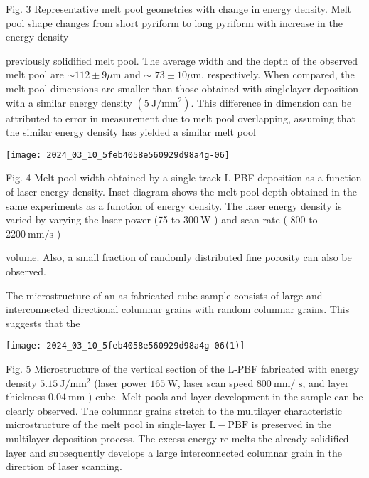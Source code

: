 \documentclass[10pt]{article}
\begin{document}
Fig. 3 Representative melt pool geometries with change in energy density. Melt pool shape changes from short pyriform to long pyriform with increase in the energy density

previously solidified melt pool. The average width and the depth of the observed melt pool are $\sim 112 \pm 9 \mu \mathrm{m}$ and $\sim$ $73 \pm 10 \mu \mathrm{m}$, respectively. When compared, the melt pool dimensions are smaller than those obtained with singlelayer deposition with a similar energy density $\left(5 \mathrm{~J} / \mathrm{mm}^{2}\right)$. This difference in dimension can be attributed to error in measurement due to melt pool overlapping, assuming that the similar energy density has yielded a similar melt pool

\begin{center}
\texttt{[image: 2024\_03\_10\_5feb4058e560929d98a4g-06]}
\end{center}

Fig. 4 Melt pool width obtained by a single-track L-PBF deposition as a function of laser energy density. Inset diagram shows the melt pool depth obtained in the same experiments as a function of energy density. The laser energy density is varied by varying the laser power (75 to $300 \mathrm{~W}$ ) and scan rate ( 800 to $2200 \mathrm{~mm} / \mathrm{s}$ )

volume. Also, a small fraction of randomly distributed fine porosity can also be observed.

The microstructure of an as-fabricated cube sample consists of large and interconnected directional columnar grains with random columnar grains. This suggests that the

\begin{center}
\texttt{[image: 2024\_03\_10\_5feb4058e560929d98a4g-06(1)]}
\end{center}

Fig. 5 Microstructure of the vertical section of the L-PBF fabricated with energy density $5.15 \mathrm{~J} / \mathrm{mm}^{2}$ (laser power $165 \mathrm{~W}$, laser scan speed $800 \mathrm{~mm} /$ $\mathrm{s}$, and layer thickness $0.04 \mathrm{~mm}$ ) cube. Melt pools and layer development in the sample can be clearly observed. The columnar grains stretch to the multilayer characteristic microstructure of the melt pool in single-layer $\mathrm{L}-\mathrm{PBF}$ is preserved in the multilayer deposition process. The excess energy re-melts the already solidified layer and subsequently develops a large interconnected columnar grain in the direction of laser scanning.
\end{document}
